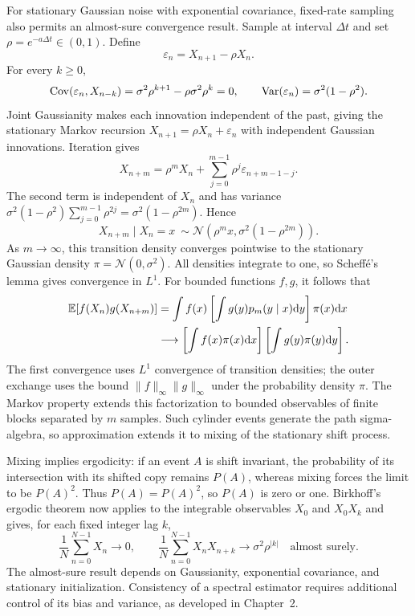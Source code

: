 For stationary Gaussian noise with exponential covariance, fixed-rate sampling also permits an almost-sure convergence result. Sample at interval $\Delta t$ and set $\rho=e^{-a\Delta t}\in(0,1)$. Define
\[
\varepsilon_n=X_{n+1}-\rho X_n.
\]
For every $k\geq0$,
\[
\operatorname{Cov}(\varepsilon_n,X_{n-k})
=\sigma^2\rho^{k+1}-\rho\sigma^2\rho^k=0,
\qquad \operatorname{Var}(\varepsilon_n)=\sigma^2(1-\rho^2).
\]
Joint Gaussianity makes each innovation independent of the past, giving the stationary Markov recursion
$X_{n+1}=\rho X_n+\varepsilon_n$ with independent Gaussian innovations.
Iteration gives
\[
X_{n+m}=\rho^mX_n+\sum_{j=0}^{m-1}\rho^j\varepsilon_{n+m-1-j}.
\]
The second term is independent of $X_n$ and has variance
$\sigma^2(1-\rho^2)\sum_{j=0}^{m-1}\rho^{2j}=\sigma^2(1-\rho^{2m})$. Hence
\[
X_{n+m}\mid X_n=x\ \sim\mathcal N(\rho^m x,\sigma^2(1-\rho^{2m})).
\]
As $m\to\infty$, this transition density converges pointwise to the stationary Gaussian density $\pi=\mathcal N(0,\sigma^2)$. All densities integrate to one, so Scheff\'{e}'s lemma gives convergence in $L^1$. For bounded functions $f,g$, it follows that
\begin{align*}
\mathbb E[f(X_n)g(X_{n+m})]
&=\int f(x)\left[\int g(y)p_m(y\mid x)\mathrm d y\right]\pi(x)\mathrm d x\\
&\longrightarrow\left[\int f(x)\pi(x)\mathrm d x\right]
\left[\int g(y)\pi(y)\mathrm d y\right].
\end{align*}
The first convergence uses $L^1$ convergence of transition densities; the outer exchange uses the bound $\|f\|_\infty\|g\|_\infty$ under the probability density $\pi$. The Markov property extends this factorization to bounded observables of finite blocks separated by $m$ samples. Such cylinder events generate the path sigma-algebra, so approximation extends it to mixing of the stationary shift process.

Mixing implies ergodicity: if an event $A$ is shift invariant, the probability of its intersection with its shifted copy remains $P(A)$, whereas mixing forces the limit to be $P(A)^2$. Thus $P(A)=P(A)^2$, so $P(A)$ is zero or one. Birkhoff's ergodic theorem now applies to the integrable observables $X_0$ and $X_0X_k$ and gives, for each fixed integer lag $k$,
\[
\frac1N\sum_{n=0}^{N-1}X_n\to0,\qquad
\frac1N\sum_{n=0}^{N-1}X_nX_{n+k}\to\sigma^2\rho^{|k|}
\quad\text{almost surely}.
\]
The almost-sure result depends on Gaussianity, exponential covariance, and stationary initialization. Consistency of a spectral estimator requires additional control of its bias and variance, as developed in Chapter~2.


